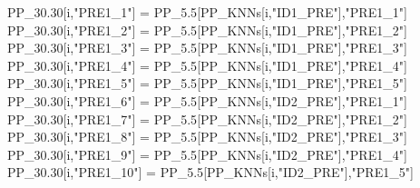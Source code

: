 \documentclass[12pt,twoside]{reedthesis}
\newenvironment{Shaded}{\begin{snugshade}}{\end{snugshade}}
\newcommand{\FloatTok}[1]{\textcolor[rgb]{0.00,0.00,0.81}{#1}}
\newcommand{\NormalTok}[1]{#1}
\newcommand{\StringTok}[1]{\textcolor[rgb]{0.31,0.60,0.02}{#1}}
\begin{document}
\begin{Shaded}
\begin{Highlighting}[]
{\NormalTok{  PP_}\FloatTok{30.30}\NormalTok{[i,}\StringTok{"PRE1_1"}\NormalTok{] =}\StringTok{ }\NormalTok{PP_}\FloatTok{5.5}\NormalTok{[PP_KNNs[i,}\StringTok{"ID1_PRE"}\NormalTok{],}\StringTok{"PRE1_1"}\NormalTok{]}
\NormalTok{  PP_}\FloatTok{30.30}\NormalTok{[i,}\StringTok{"PRE1_2"}\NormalTok{] =}\StringTok{ }\NormalTok{PP_}\FloatTok{5.5}\NormalTok{[PP_KNNs[i,}\StringTok{"ID1_PRE"}\NormalTok{],}\StringTok{"PRE1_2"}\NormalTok{]}
\NormalTok{  PP_}\FloatTok{30.30}\NormalTok{[i,}\StringTok{"PRE1_3"}\NormalTok{] =}\StringTok{ }\NormalTok{PP_}\FloatTok{5.5}\NormalTok{[PP_KNNs[i,}\StringTok{"ID1_PRE"}\NormalTok{],}\StringTok{"PRE1_3"}\NormalTok{]}
\NormalTok{  PP_}\FloatTok{30.30}\NormalTok{[i,}\StringTok{"PRE1_4"}\NormalTok{] =}\StringTok{ }\NormalTok{PP_}\FloatTok{5.5}\NormalTok{[PP_KNNs[i,}\StringTok{"ID1_PRE"}\NormalTok{],}\StringTok{"PRE1_4"}\NormalTok{]}
\NormalTok{  PP_}\FloatTok{30.30}\NormalTok{[i,}\StringTok{"PRE1_5"}\NormalTok{] =}\StringTok{ }\NormalTok{PP_}\FloatTok{5.5}\NormalTok{[PP_KNNs[i,}\StringTok{"ID1_PRE"}\NormalTok{],}\StringTok{"PRE1_5"}\NormalTok{]}
\NormalTok{  PP_}\FloatTok{30.30}\NormalTok{[i,}\StringTok{"PRE1_6"}\NormalTok{] =}\StringTok{ }\NormalTok{PP_}\FloatTok{5.5}\NormalTok{[PP_KNNs[i,}\StringTok{"ID2_PRE"}\NormalTok{],}\StringTok{"PRE1_1"}\NormalTok{]}
\NormalTok{  PP_}\FloatTok{30.30}\NormalTok{[i,}\StringTok{"PRE1_7"}\NormalTok{] =}\StringTok{ }\NormalTok{PP_}\FloatTok{5.5}\NormalTok{[PP_KNNs[i,}\StringTok{"ID2_PRE"}\NormalTok{],}\StringTok{"PRE1_2"}\NormalTok{]}
\NormalTok{  PP_}\FloatTok{30.30}\NormalTok{[i,}\StringTok{"PRE1_8"}\NormalTok{] =}\StringTok{ }\NormalTok{PP_}\FloatTok{5.5}\NormalTok{[PP_KNNs[i,}\StringTok{"ID2_PRE"}\NormalTok{],}\StringTok{"PRE1_3"}\NormalTok{]}
\NormalTok{  PP_}\FloatTok{30.30}\NormalTok{[i,}\StringTok{"PRE1_9"}\NormalTok{] =}\StringTok{ }\NormalTok{PP_}\FloatTok{5.5}\NormalTok{[PP_KNNs[i,}\StringTok{"ID2_PRE"}\NormalTok{],}\StringTok{"PRE1_4"}\NormalTok{]}
\NormalTok{  PP_}\FloatTok{30.30}\NormalTok{[i,}\StringTok{"PRE1_10"}\NormalTok{] =}\StringTok{ }\NormalTok{PP_}\FloatTok{5.5}\NormalTok{[PP_KNNs[i,}\StringTok{"ID2_PRE"}\NormalTok{],}\StringTok{"PRE1_5"}\NormalTok{]}

}
\end{Highlighting}
\end{Shaded}
\end{document}
